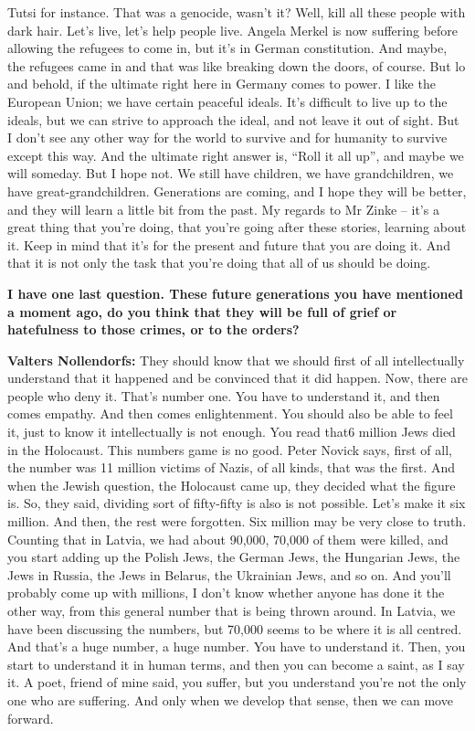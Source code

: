Tutsi for instance. That was a genocide, wasn’t it? Well, kill all these people with dark hair. Let’s live, let’s help people live. Angela Merkel is now suffering before allowing the refugees to come in, but it’s in German constitution. And maybe, the refugees came in and that was like breaking down the doors, of course. But lo and behold, if the ultimate right here in Germany comes to power. I like the European Union; we have certain peaceful ideals. It’s difficult to live up to the ideals, but we can strive to approach the ideal, and not leave it out of sight. But I don’t see any other way for the world to survive and for humanity to survive except this way. And the ultimate right answer is, ``Roll it all up'', and maybe we will someday. But I hope not. We still have children, we have grandchildren, we have great-grandchildren. Generations are coming, and I hope they will be better, and they will learn a little bit from the past. My regards to Mr Zinke – it’s a great thing that you’re doing, that you’re going after these stories, learning about it. Keep in mind that it’s for the present and future that you are doing it. And that it is not only the task that you’re doing that all of us should be doing.

\textbf{I have one last question. These future generations you have mentioned a moment ago, do you think that they will be full of grief or hatefulness to those crimes, or to the orders?}

\textbf{Valters Nollendorfs:} They should know that we should first of all intellectually understand that it happened and be convinced that it did happen. Now, there are people who deny it. That’s number one. You have to understand it, and then comes empathy. And then comes enlightenment. You should also be able to feel it, just to know it intellectually is not enough. You read that6 million Jews died in the Holocaust. This numbers game is no good. Peter Novick says, first of all, the number was 11 million victims of Nazis, of all kinds, that was the first. And when the Jewish question, the Holocaust came up, they decided what the figure is. So, they said, dividing sort of fifty-fifty is also is not possible. Let’s make it six million. And then, the rest were forgotten. Six million may be very close to truth. Counting that in Latvia, we had about 90,000, 70,000 of them were killed, and you start adding up the Polish Jews, the German Jews, the Hungarian Jews, the Jews in Russia, the Jews in Belarus, the Ukrainian Jews, and so on. And you’ll probably come up with millions, I don’t know whether anyone has done it the other way, from this general number that is being thrown around. In Latvia, we have been discussing the numbers, but 70,000 seems to be where it is all centred. And that’s a huge number, a huge number. You have to understand it. Then, you start to understand it in human terms, and then you can become a saint, as I say it. A poet, friend of mine said, you suffer, but you understand you’re not the only one who are suffering. And only when we develop that sense, then we can move forward. 
